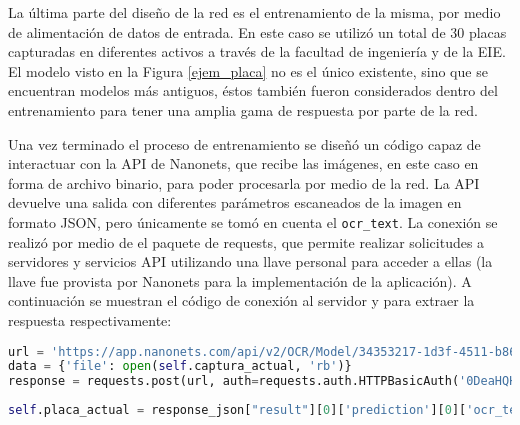 \par
La última parte del diseño de la red es el entrenamiento de la misma, por medio de alimentación de datos de entrada. En este caso se utilizó un total de 30 placas capturadas en diferentes activos a través de la facultad de ingeniería y de la EIE. El modelo visto en la Figura \ref{ejem_placa} no es el único existente, sino que se encuentran modelos más antiguos, éstos también fueron considerados dentro del entrenamiento para tener una amplia gama de respuesta por parte de la red. 
\par
Una vez terminado el proceso de entrenamiento se diseñó un código capaz de interactuar con la API de Nanonets, que recibe las imágenes, en este caso en forma de archivo binario, para poder procesarla por medio de la red. La API devuelve una salida con diferentes parámetros escaneados de la imagen en formato JSON, pero únicamente se tomó en cuenta el \lstinline{ocr_text}. La conexión se realizó por medio de el paquete de requests, que permite realizar solicitudes a servidores y servicios API utilizando una llave personal para acceder a ellas (la llave fue provista por Nanonets para la implementación de la aplicación). A continuación se muestran el código de conexión al servidor y para extraer la respuesta respectivamente: 

\begin{lstlisting}[language=Python,frame=single,caption=Código para envío de las placas y recibimiento del texto de la misma (creación propia), inputencoding=latin1]
url = 'https://app.nanonets.com/api/v2/OCR/Model/34353217-1d3f-4511-b86f-e24e842e66e8/LabelFile/?async=false'
data = {'file': open(self.captura_actual, 'rb')}
response = requests.post(url, auth=requests.auth.HTTPBasicAuth('0DeaHQHCf7qAs9n7mFAGmF9gHd6IVMA9', ''), files=data)
\end{lstlisting}

\begin{lstlisting}[language=Python,frame=single,caption=Código para extracción del texto de la placa de la respuesta de la red neuronal (creación propia), inputencoding=latin1]
self.placa_actual = response_json["result"][0]['prediction'][0]['ocr_text']
\end{lstlisting}

